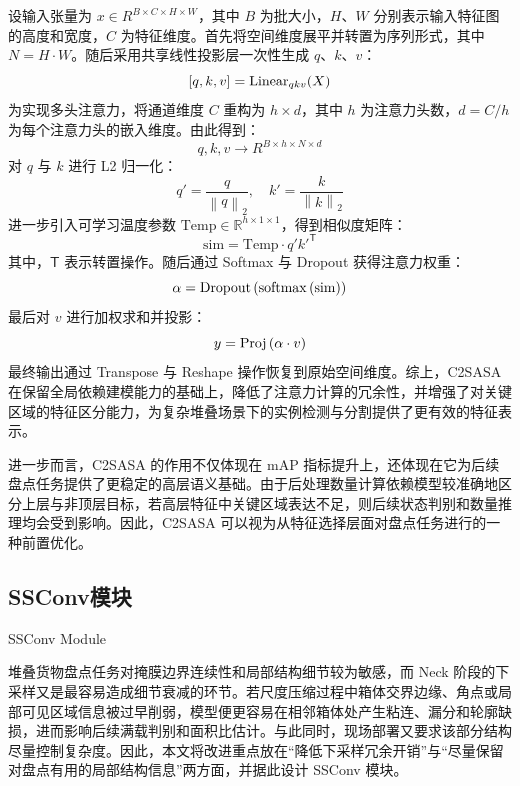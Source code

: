 设输入张量为 $x\in R^{B\times C\times H\times W}$，其中 $B$ 为批大小，$H$、$W$ 分别表示输入特征图的高度和宽度，$C$ 为特征维度。首先将空间维度展平并转置为序列形式，其中 $N=H\cdot W$。随后采用共享线性投影层一次性生成 $q$、$k$、$v$：
\begin{equation}\label{eq:qkv}
[q,k,v] = {\rm{Linear}}_{qkv}(X)
\end{equation}
为实现多头注意力，将通道维度 $C$ 重构为 $h\times d$，其中 $h$ 为注意力头数，$d=C/h$ 为每个注意力头的嵌入维度。由此得到：
\begin{equation}\label{eq:qkv-reshape}
q,k,v \to R^{B \times h \times N \times d}
\end{equation}
对 $q$ 与 $k$ 进行 L2 归一化：
\begin{equation}\label{eq:qk-normalize}
q' = \frac{q}{{\left\| q \right\|_2}},\quad
k' = \frac{k}{{\left\| k \right\|_2}}
\end{equation}
进一步引入可学习温度参数 $\mathrm{Temp}\in\mathbb{R}^{h\times1\times1}$，得到相似度矩阵：
\begin{equation}\label{eq:sim}
\mathrm{sim} = \mathrm{Temp} \cdot q'k'^{\mathsf T}
\end{equation}
其中，$\mathsf T$ 表示转置操作。随后通过 Softmax 与 Dropout 获得注意力权重：
\begin{equation}\label{eq:attn-weight}
\alpha = {\rm{Dropout}}\left( {{\rm{softmax}}\left( {{\rm{sim}}} \right)} \right)
\end{equation}
最后对 $v$ 进行加权求和并投影：
\begin{equation}\label{eq:attn-output}
y = {\rm{Proj}}\left( {\alpha  \cdot v} \right)
\end{equation}
最终输出通过 Transpose 与 Reshape 操作恢复到原始空间维度。综上，C2SASA 在保留全局依赖建模能力的基础上，降低了注意力计算的冗余性，并增强了对关键区域的特征区分能力，为复杂堆叠场景下的实例检测与分割提供了更有效的特征表示。

进一步而言，C2SASA 的作用不仅体现在 mAP 指标提升上，还体现在它为后续盘点任务提供了更稳定的高层语义基础。由于后处理数量计算依赖模型较准确地区分上层与非顶层目标，若高层特征中关键区域表达不足，则后续状态判别和数量推理均会受到影响。因此，C2SASA 可以视为从特征选择层面对盘点任务进行的一种前置优化。

\subsection{SSConv模块}{SSConv Module}

堆叠货物盘点任务对掩膜边界连续性和局部结构细节较为敏感，而 Neck 阶段的下采样又是最容易造成细节衰减的环节。若尺度压缩过程中箱体交界边缘、角点或局部可见区域信息被过早削弱，模型便更容易在相邻箱体处产生粘连、漏分和轮廓缺损，进而影响后续满载判别和面积比估计。与此同时，现场部署又要求该部分结构尽量控制复杂度。因此，本文将改进重点放在“降低下采样冗余开销”与“尽量保留对盘点有用的局部结构信息”两方面，并据此设计 SSConv 模块。


